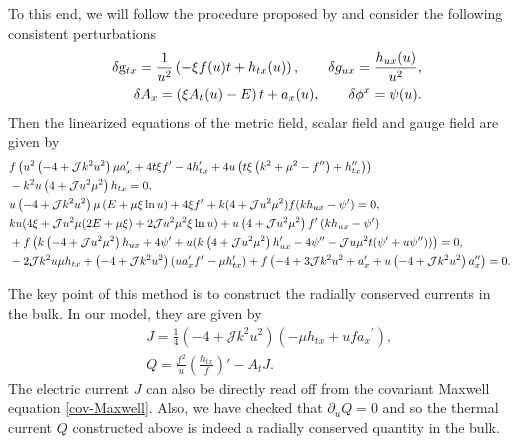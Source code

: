 \documentclass[preprint,onecolumn,nofootinbib]{revtex4}
\newcommand{\fa}{\begin{eqnarray}}
\newcommand{\ffa}{\end{eqnarray}}
\begin{document}
To this end, we will follow the procedure proposed by \cite{Donos:2014cya} and consider the following consistent perturbations
\fa
&&
\delta {{\rm{g}}_{tx}} = \frac{1}{u^2}\left( - \xi f(u) t + h_{tx}(u)\right),\qquad
\delta {g_{ux}} = \frac{{{h _{ux}(u)}}}{{{u^2}}},\nonumber\\
\label{eq:8}
&&
\delta {A_x} = \left( {\xi {A_t(u)} - {E}} \right)t + {a_x(u)},\qquad
\delta {\phi^x} = \psi(u).
\label{eq:9}
\ffa
Then the linearized equations of the metric field, scalar field and gauge field are given by
\begin{align}
&f\left(u^{2}\left(-4+\mathcal{J} k^{2} u^{2}\right) \mu a_{x}^{\prime}+4 t \xi f^{\prime}-4 h_{t x}^{\prime}+4 u\left(t \xi\left(k^{2}+\mu^{2}-f^{\prime \prime}\right)+h_{t x}^{\prime \prime}\right)\right)  \nonumber \\
&-k^{2} u\left(4+\mathcal{J} u^{2} \mu^{2}\right) h_{t x}=0,\\
&u\left( { - 4 + {\cal J}{k^2}{u^2}} \right)\mu \left( {E + \mu \xi \ln u} \right) + 4\xi f' + k(4 + {\cal J}{u^2}{\mu ^2})f(k{h_{ux}} - \psi ') = 0,\label{eq12}\\
&ku(4\xi  + {\cal J}{u^2}\mu (2E + \mu \xi ) + 2{\cal J}{u^2}{\mu ^2}\xi \ln u) + u\left( {4 + {\cal J}{u^2}{\mu ^2}} \right){f^\prime }\left( {k{h_{ux}} - {\psi ^\prime }} \right)\nonumber \\
&+f\left(k\left(-4+\mathcal{J} u^{2} \mu^{2}\right) h_{u x}+4 \psi^{\prime}+u(k\left(4+\mathcal{J} u^{2} \mu^{2}\right) h_{u x}^{\prime}-4 \psi^{\prime \prime}-\mathcal{J} u \mu^{2}t(\psi^{\prime}+u \psi^{\prime \prime}))\right)=0,\\
&-2 \mathcal{J} k^{2} u \mu h_{t x}+\left(-4+\mathcal{J} k^{2} u^{2}\right)\left(u a_{x}^{\prime} f^{\prime}-\mu h_{t x}^{\prime}\right)+f\left(-4+3 \mathcal{J} k^{2} u^{2}+a_{x}^{\prime}+u\left(-4+\mathcal{J} k^{2} u^{2}\right) a_{x}^{\prime \prime}\right)=0.\label{maxwell1}
\end{align}

The key point of this method is to construct the radially conserved currents in the bulk. In our model, they are given by
\fa
&&
J = \frac{1}{4}\left( { - 4 + \mathcal{J}{k^2}{u^2}} \right)\left( { - \mu {h_{tx}} + uf{a_x}^\prime } \right),
\
\\
&&
Q=\frac{f^2}{u}\left(\frac{h_{tx}}{f}\right)'-A_t J.
\ffa
The electric current $J$ can also be directly read off from the covariant Maxwell equation \eqref{cov-Maxwell}. Also, we have checked that $\partial_u Q=0$ and so the thermal current $Q$ constructed above is indeed a radially conserved quantity in the bulk.
\end{document}
